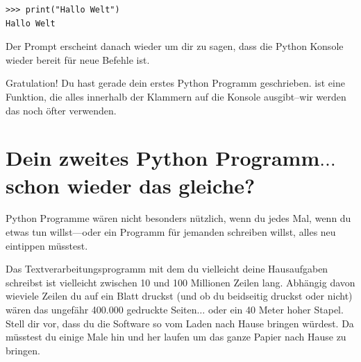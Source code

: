 \begin{Verbatim}[frame=single]
>>> print("Hallo Welt")
Hallo Welt
\end{Verbatim}

Der Prompt erscheint danach wieder um dir zu sagen, dass die Python Konsole wieder bereit für neue Befehle ist.

\noindent
Gratulation! Du hast gerade dein erstes Python Programm geschrieben.  ist eine Funktion, die alles innerhalb der Klammern auf die Konsole ausgibt--wir werden das noch öfter verwenden.

\section{Dein zweites Python Programm$\ldots$schon wieder das gleiche?}

Python Programme wären nicht besonders nützlich, wenn du jedes Mal, wenn du etwas tun willst---oder ein Programm für jemanden schreiben willst, alles neu eintippen müsstest.

Das Textverarbeitungsprogramm mit dem du vielleicht deine Hausaufgaben schreibst ist vielleicht zwischen 10 und 100 Millionen Zeilen lang. Abhängig davon wieviele Zeilen du auf ein Blatt druckst (und ob du beidseitig druckst oder nicht) wären das ungefähr 400.000 gedruckte Seiten$\ldots$ oder ein 40 Meter hoher Stapel.
Stell dir vor, dass du die Software so vom Laden nach Hause bringen würdest. Da müsstest du einige Male hin und her laufen um das ganze Papier nach Hause zu bringen.

